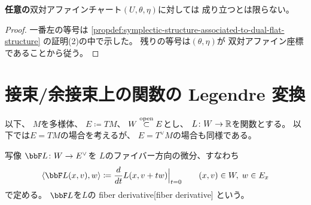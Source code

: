 \documentclass[report]{jlreq}
\begin{document}
\begin{remark}
    \textbf{任意の}双対アファインチャート$(U, \theta, \eta)$に対しては
    成り立つとは限らない。
\end{remark}

\begin{proof}
    一番左の等号は
    \cref{propdef:symplectic-structure-associated-to-dual-flat-structure}
    の証明(2)の中で示した。
    残りの等号は$(\theta, \eta)$が
    双対アファイン座標であることから従う。
\end{proof}


%
\section{接束/余接束上の関数の Legendre 変換}

以下、
$M$を多様体、
$E \coloneqq TM$、
$W \stackrel{\text{open}}{\subset} E$とし、
$L \colon W \to \mathbb{R}$を{\smooth}関数とする。
以下では$E = TM$の場合を考えるが、
$E = T^\vee M$の場合も同様である。

\begin{definition}
    写像
    $\bbF L \colon W \to E^\vee$を
    $L$のファイバー方向の微分、すなわち
    \begin{equation}
        \myangle{\bbF L(x, v)}{w}
            \coloneqq
                \dd{t} L(x, v + tw) \Big|_{t = 0}
                \qquad
                (x, v) \in W, \; w \in E_x
    \end{equation}
    で定める。
    $\bbF L$を$L$の
        {fiber derivative}[fiber derivative]
    という。
\end{definition}
\end{document}
